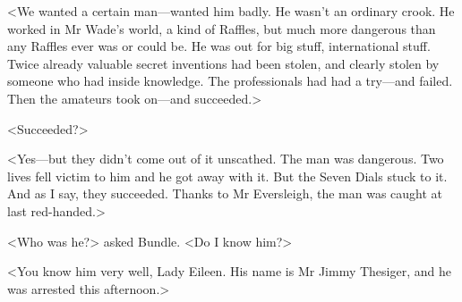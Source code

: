 <We wanted a certain man—wanted him badly. He wasn't an ordinary crook. He worked in Mr Wade's world, a kind of Raffles, but much more dangerous than any Raffles ever was or could be. He was out for big stuff, international stuff. Twice already valuable secret inventions had been stolen, and clearly stolen by someone who had inside knowledge. The professionals had had a try—and failed. Then the amateurs took on—and succeeded.>

<Succeeded?>

<Yes—but they didn't come out of it unscathed. The man was dangerous. Two lives fell victim to him and he got away with it. But the Seven Dials stuck to it. And as I say, they succeeded. Thanks to Mr Eversleigh, the man was caught at last red-handed.>

<Who was he?> asked Bundle. <Do I know him?>

<You know him very well, Lady Eileen. His name is Mr Jimmy Thesiger, and he was arrested this afternoon.>